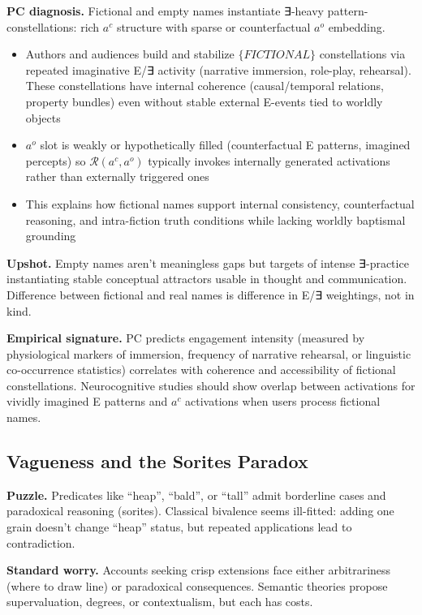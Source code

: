 \documentclass[12pt]{article}
\providecommand{\tightlist}{}   %
\begin{document}
\textbf{PC diagnosis.} Fictional and empty names instantiate ∃-heavy pattern-constellations: rich \(a^c\) structure with sparse or counterfactual \(a^o\) embedding.

\begin{itemize}
\tightlist
\item
  Authors and audiences build and stabilize \(\{FICTIONAL\}\) constellations via repeated imaginative E/∃ activity (narrative immersion, role-play, rehearsal). These constellations have internal coherence (causal/temporal relations, property bundles) even without stable external E-events tied to worldly objects
\item
  \(a^o\) slot is weakly or hypothetically filled (counterfactual E patterns, imagined percepts) so \(\mathcal{R}(a^c, a^o)\) typically invokes internally generated activations rather than externally triggered ones
\item
  This explains how fictional names support internal consistency, counterfactual reasoning, and intra-fiction truth conditions while lacking worldly baptismal grounding
\end{itemize}

\textbf{Upshot.} Empty names aren't meaningless gaps but targets of intense ∃-practice instantiating stable conceptual attractors usable in thought and communication. Difference between fictional and real names is difference in E/∃ weightings, not in kind.

\textbf{Empirical signature.} PC predicts engagement intensity (measured by physiological markers of immersion, frequency of narrative rehearsal, or linguistic co-occurrence statistics) correlates with coherence and accessibility of fictional constellations. Neurocognitive studies should show overlap between activations for vividly imagined E patterns and \(a^c\) activations when users process fictional names.

\subsection{Vagueness and the Sorites Paradox}\label{vagueness-and-the-sorites-paradox}

\textbf{Puzzle.} Predicates like ``heap'', ``bald'', or ``tall'' admit borderline cases and paradoxical reasoning (sorites). Classical bivalence seems ill-fitted: adding one grain doesn't change ``heap'' status, but repeated applications lead to contradiction.

\textbf{Standard worry.} Accounts seeking crisp extensions face either arbitrariness (where to draw line) or paradoxical consequences. Semantic theories propose supervaluation, degrees, or contextualism, but each has costs.
\end{document}
